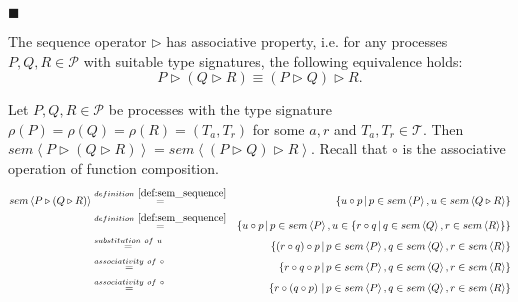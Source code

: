 \begin{myproof}
\hfill$\blacksquare$
\end{myproof}

\begin{theorem}
\label{thm:associativity_sequence}
The sequence operator $\triangleright$ has associative property, i.e. for any processes $P, Q, R \in \mathcal{P}$ with suitable type signatures, the following equivalence holds:
\begin{equation*}
  P \triangleright \left( Q \triangleright R \right) \equiv \left( P \triangleright Q \right) \triangleright R.
\end{equation*}
\end{theorem}

\begin{myproof}
Let $P, Q, R \in \mathcal{P}$ be processes with the type signature $\rho \left( P \right) = \rho \left( Q \right) = \rho \left( R \right) = \left( T_a, T_r \right)$ for some $a, r$ and $T_a, T_r \in \mathcal{T}$. Then $sem \left\langle P \triangleright \left( Q \triangleright R \right) \right\rangle = sem \left\langle \left( P \triangleright Q \right) \triangleright R \right\rangle$. Recall that $\circ$ is the associative operation of function composition.
\begin{eqnarray*}
  sem \left\langle P \triangleright \left( Q \triangleright R \right) \right\rangle & \overset{\defref{def:sem_sequence}}{=} & \left\{ u \circ p \,|\, p \in sem \left\langle P \right\rangle, u \in sem \left\langle Q \triangleright R \right\rangle \right\} \\
  & \overset{\defref{def:sem_sequence}}{=} & \left\{ u \circ p \,|\, p \in sem \left\langle P \right\rangle, u \in \left\{r \circ q \,|\, q \in sem \left\langle Q \right\rangle, r \in sem \left\langle R \right\rangle \right\} \right\} \\
  & \overset{substitution \ of \ u}{=} & \left\{ \left( r \circ q \right) \circ p \,|\, p \in sem \left\langle P \right\rangle, q \in sem \left\langle Q \right\rangle, r \in sem \left\langle R \right\rangle \right\} \\
  & \overset{associativity \ of \  \circ}{=} & \left\{ r \circ q \circ p \,|\, p \in sem \left\langle P \right\rangle, q \in sem \left\langle Q \right\rangle, r \in sem \left\langle R \right\rangle \right\} \\
  & \overset{associativity \ of \  \circ}{=} & \left\{ r \circ \left( q \circ p \right) \,|\, p \in sem \left\langle P \right\rangle, q \in sem \left\langle Q \right\rangle, r \in sem \left\langle R \right\rangle \right\} \\

\end{eqnarray*}
\end{myproof}
